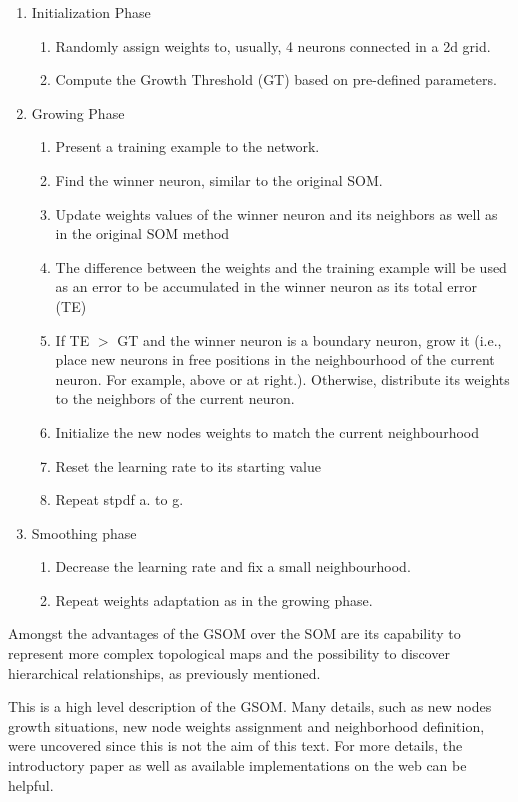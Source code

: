 \begin{enumerate}
    \item Initialization Phase
    \begin{enumerate}
        \item Randomly assign weights to, usually, 4 neurons connected in a 2d grid.
        \item Compute the Growth Threshold (GT) based on pre-defined parameters. 
    \end{enumerate}
    \item Growing Phase 
    \begin{enumerate}
        \item Present a training example to the network.
        \item Find the winner neuron, similar to the original SOM.
        \item Update weights values of the winner neuron and its neighbors as well as in the original SOM method
        \item The difference between the weights and the training example will be used as an error to be accumulated in the winner neuron as its total error (TE)
        \item If TE $>$ GT and the winner neuron is a boundary neuron, grow it (i.e., place new neurons in free positions in the neighbourhood of the current neuron. For example, above or at right.). Otherwise, distribute its weights to the neighbors of the current neuron.
        \item Initialize the new nodes weights to match the current neighbourhood
        \item Reset the learning rate to its starting value
        \item Repeat stpdf a. to g.
    \end{enumerate}
    \item Smoothing phase
    \begin{enumerate}
        \item Decrease the learning rate and fix a small neighbourhood.
        \item Repeat weights adaptation as in the growing phase.
    \end{enumerate}
\end{enumerate}

Amongst the advantages of the GSOM over the SOM are its capability to represent more complex topological maps and the possibility to discover hierarchical relationships, as previously mentioned.

This is a high level description of the GSOM. Many details, such as new nodes growth situations, new node weights assignment and neighborhood definition, were uncovered since this is not the aim of this text. For more details, the introductory paper \cite{Alahakoon:2000} as well as available implementations on the web can be helpful.


